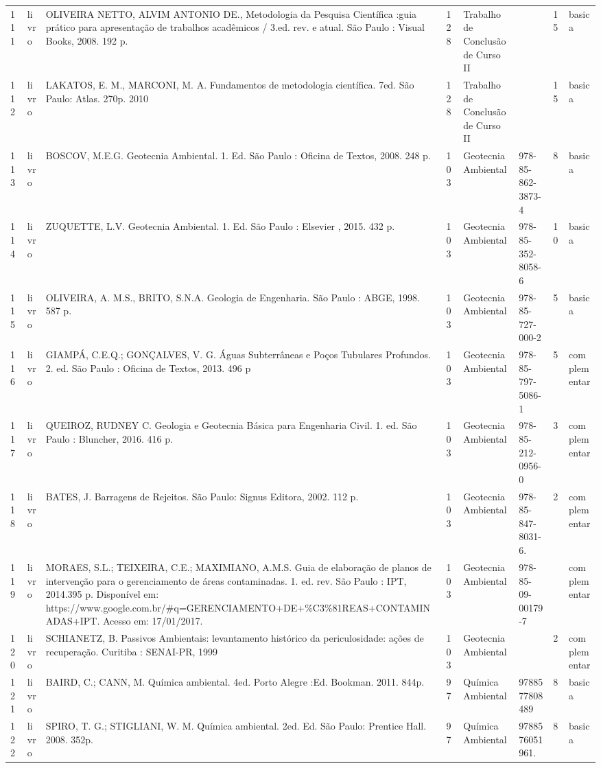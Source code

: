 \documentclass[12pt,a4paper,twoside]{report}
\begin{document}
\begin{longtable}{l|l|p{4cm}|l|p{3cm}|p{3cm}|l|l}
111&livro&OLIVEIRA NETTO, ALVIM ANTONIO DE., Metodologia da Pesquisa Científica :guia prático para apresentação de trabalhos acadêmicos / 3.ed. rev. e atual. São Paulo : Visual Books, 2008. 192 p.&128&Trabalho de Conclusão de Curso II&&15&basica\\
112&livro&LAKATOS, E. M., MARCONI, M. A. Fundamentos de metodologia científica. 7ed. São Paulo: Atlas. 270p. 2010&128&Trabalho de Conclusão de Curso II&&15&basica\\
113&livro&BOSCOV, M.E.G. Geotecnia Ambiental. 1. Ed. São Paulo : Oficina de Textos, 2008. 248 p.&103&Geotecnia Ambiental&978-85-862-3873-4&8&basica\\
114&livro&ZUQUETTE, L.V. Geotecnia Ambiental. 1. Ed. São Paulo : Elsevier , 2015. 432 p.&103&Geotecnia Ambiental&978-85-352-8058-6&10&basica\\
115&livro&OLIVEIRA, A. M.S., BRITO, S.N.A. Geologia de Engenharia. São Paulo : ABGE, 1998. 587 p.&103&Geotecnia Ambiental&978-85-727-000-2&5&basica\\
116&livro&GIAMPÁ, C.E.Q.; GONÇALVES, V. G. Águas Subterrâneas e Poços Tubulares Profundos. 2. ed. São Paulo : Oficina de Textos, 2013. 496 p&103&Geotecnia Ambiental&978-85-797-5086-1&5&complementar\\
117&livro&QUEIROZ, RUDNEY C. Geologia e Geotecnia Básica para Engenharia Civil. 1. ed. São Paulo : Bluncher, 2016. 416 p.&103&Geotecnia Ambiental&978-85-212-0956-0&3&complementar\\
118&livro&BATES, J.  Barragens de Rejeitos. São Paulo: Signus Editora, 2002. 112 p.&103&Geotecnia Ambiental&978-85-847-8031-6.&2&complementar\\
119&livro&MORAES, S.L.; TEIXEIRA, C.E.; MAXIMIANO, A.M.S. Guia de elaboração de planos de intervenção para o gerenciamento de áreas contaminadas. 1. ed. rev. São Paulo : IPT, 2014.395 p. Disponível em: https://www.google.com.br/\#q=GERENCIAMENTO+DE+\%C3\%81REAS+CONTAMINADAS+IPT. Acesso em: 17/01/2017.&103&Geotecnia Ambiental&978-85-09-00179-7&&complementar\\
120&livro&SCHIANETZ, B. Passivos Ambientais: levantamento histórico da periculosidade: ações de recuperação. Curitiba : SENAI-PR, 1999&103&Geotecnia Ambiental&&2&complementar\\
121&livro&BAIRD, C.; CANN, M. Química ambiental. 4ed. Porto Alegre :Ed. Bookman. 2011. 844p.&97&Química Ambiental&9788577808489&8&basica\\
122&livro&SPIRO, T. G.; STIGLIANI, W. M. Química ambiental. 2ed. Ed. São Paulo: Prentice Hall. 2008. 352p.&97&Química Ambiental&9788576051961.&8&basica\\

\end{longtable}
\end{document}
